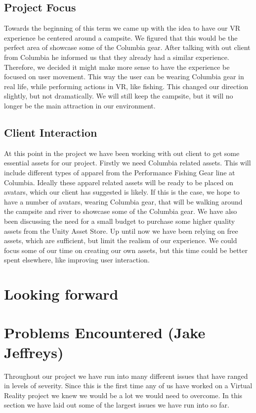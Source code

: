 \documentclass[10pt,journal,compsoc,onecolumn, draftclsnofoot]{IEEEtran}
\begin{document}
\subsection{Project Focus}
Towards the beginning of this term we came up with the idea to have our VR experience be centered around a campsite.
We figured that this would be the perfect area of showcase some of the Columbia gear.
After talking with out client from Columbia he informed us that they already had a similar experience.
Therefore, we decided it might make more sense to have the experience be focused on user movement.
This way the user can be wearing Columbia gear in real life, while performing actions in VR, like fishing.
This changed our direction slightly, but not dramatically.
We will still keep the campsite, but it will no longer be the main attraction in our environment.

\subsection{Client Interaction}
At this point in the project we have been working with out client to get some essential assets for our project.
Firstly we need Columbia related assets.
This will include different types of apparel from the Performance Fishing Gear line at Columbia.
Ideally these apparel related assets will be ready to be placed on avatars, which our client has suggested is likely.
If this is the case, we hope to have a number of avatars, wearing Columbia gear, that will be walking around the campsite and river to showcase some of the Columbia gear.
We have also been discussing the need for a small budget to purchase some higher quality assets from the Unity Asset Store.
Up until now we have been relying on free assets, which are sufficient, but limit the realism of our experience.
We could focus some of our time on creating our own assets, but this time could be better spent elsewhere, like improving user interaction.

\section{Looking forward}

\section{Problems Encountered (Jake Jeffreys)}
Throughout our project we have run into many different issues that have ranged in levels of severity.
Since this is the first time any of us have worked on a Virtual Reality project we knew we would be a lot we would need to overcome.
In this section we have laid out some of the largest issues we have run into so far.
\end{document}
